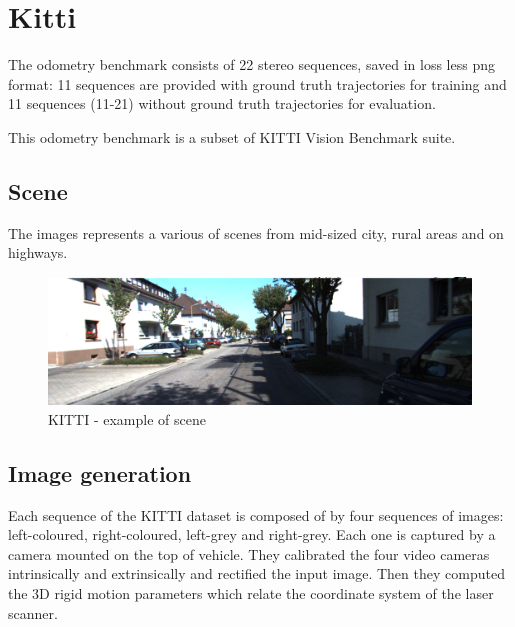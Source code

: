 
\section{Kitti}
\label{sec:kitti}

The odometry benchmark consists of 22 stereo sequences, saved in loss less png format: 11 sequences are provided with ground truth trajectories for training and 11 sequences (11-21) without ground truth trajectories for evaluation.

This odometry benchmark is a subset of KITTI Vision Benchmark suite. %

\subsection{Scene}\label{subsec:kitti-scene}
The images represents a various of scenes from mid-sized city, rural areas and on highways.
\begin{figure}[H]
    \centering
    \includegraphics[width=\textwidth]{images/3_1_example_kitti_scene}
    \caption{KITTI - example of scene}\label{fig:example-of-kitti-scene}
\end{figure}

\subsection{Image generation}\label{subsec:kitti-image-generation}
Each sequence of the KITTI dataset is composed of by four sequences of images: left-coloured, right-coloured, left-grey and right-grey.
Each one is captured by a camera mounted on the top of vehicle.
They calibrated the four video cameras intrinsically and extrinsically and rectified the input image.
Then they computed the 3D rigid motion parameters which relate the coordinate system of the laser scanner.

